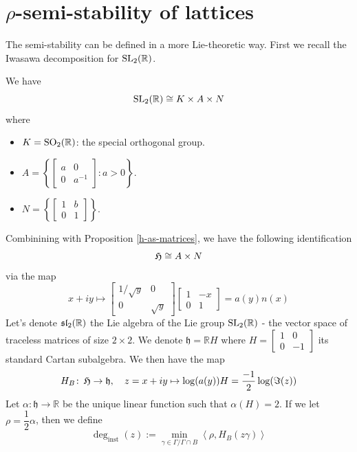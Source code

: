 \section{$\rho$-semi-stability of lattices}
The semi-stability can be defined in a more Lie-theoretic way. First we recall the Iwasawa decomposition
for $\SL2$.
\begin{prop}
  We have
  \[\SL2 \cong K \times A \times N\]
  where
  \begin{itemize}
    \item $K=\SO2$: the special orthogonal group.
    \item $A = \left\lbrace \begin{bmatrix}
              a & 0      \\
              0 & a^{-1}
            \end{bmatrix}: a >0 \right\rbrace$.
    \item  $N = \left\lbrace \begin{bmatrix}
              1 & b \\
              0 & 1
            \end{bmatrix}\right\rbrace$.
  \end{itemize}
\end{prop}
Combinining with Proposition \ref{h-as-matrices}, we have the following identification
\[\operatorname{\mathfrak{H}} \cong A \times N\]
via the map
\[x+iy \mapsto \begin{bmatrix}
    1/\sqrt{y} & 0        \\
    0          & \sqrt{y}
  \end{bmatrix}\begin{bmatrix}
    1 & -x \\
    0 & 1
  \end{bmatrix} = a\left(y\right)n(x)\]
Let's denote $\sl2$ the Lie algebra of the Lie group $\SL2$ - the vector space of traceless matrices of size $2 \times 2$. We denote
$\mathfrak{h} = \mathbb{R}H$ where $H =\begin{bmatrix}
    1 & 0  \\
    0 & -1
  \end{bmatrix}$ its standard Cartan subalgebra. We then have the map
\begin{align*}
  H_B \colon \operatorname{\mathfrak{H}} \to \mathfrak{h}, \quad
  z = x+iy \mapsto \log(a(y))H = \frac{-1}{2}\log(\Im(z))
\end{align*}
Let $\alpha\colon \mathfrak{h} \to \mathbb{R}$ be the unique linear function such that
$\alpha(H)=2$. If we let $\rho = \dfrac{1}{2}\alpha$, then we define
\[\deg_{\text{inst}}(z):= \min_{\gamma \in  \Gamma/\Gamma \cap B} \left\langle \rho,H_B(z\gamma) \right\rangle\]
